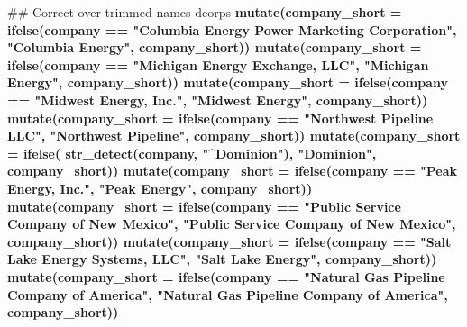 \documentclass[]{article}
\newenvironment{Shaded}{\begin{snugshade}}{\end{snugshade}}
\newcommand{\KeywordTok}[1]{\textcolor[rgb]{0.13,0.29,0.53}{\textbf{#1}}}
\newcommand{\DataTypeTok}[1]{\textcolor[rgb]{0.13,0.29,0.53}{#1}}
\newcommand{\StringTok}[1]{\textcolor[rgb]{0.31,0.60,0.02}{#1}}
\newcommand{\OperatorTok}[1]{\textcolor[rgb]{0.81,0.36,0.00}{\textbf{#1}}}
\newcommand{\NormalTok}[1]{#1}
\begin{document}
\begin{Shaded}
\begin{Highlighting}[]
\NormalTok{## Correct over-trimmed names}
\NormalTok{dcorps }\OperatorTok{%
\StringTok{  }\KeywordTok{mutate}\NormalTok{(}\DataTypeTok{company_short =} \KeywordTok{ifelse}\NormalTok{(company }\OperatorTok{==}\StringTok{ "Columbia Energy Power Marketing Corporation"}\NormalTok{, }\StringTok{"Columbia Energy"}\NormalTok{, company_short))}\OperatorTok{%
\StringTok{  }\KeywordTok{mutate}\NormalTok{(}\DataTypeTok{company_short =} \KeywordTok{ifelse}\NormalTok{(company }\OperatorTok{==}\StringTok{ "Michigan Energy Exchange, LLC"}\NormalTok{, }\StringTok{"Michigan Energy"}\NormalTok{, company_short))}\OperatorTok{%
\StringTok{  }\KeywordTok{mutate}\NormalTok{(}\DataTypeTok{company_short =} \KeywordTok{ifelse}\NormalTok{(company }\OperatorTok{==}\StringTok{ "Midwest Energy, Inc."}\NormalTok{, }\StringTok{"Midwest Energy"}\NormalTok{, company_short))}\OperatorTok{%
\StringTok{  }\KeywordTok{mutate}\NormalTok{(}\DataTypeTok{company_short =} \KeywordTok{ifelse}\NormalTok{(company }\OperatorTok{==}\StringTok{ "Northwest Pipeline LLC"}\NormalTok{, }\StringTok{"Northwest Pipeline"}\NormalTok{, company_short))}\OperatorTok{%
\StringTok{  }\KeywordTok{mutate}\NormalTok{(}\DataTypeTok{company_short =} \KeywordTok{ifelse}\NormalTok{( }\KeywordTok{str_detect}\NormalTok{(company, }\StringTok{"^Dominion"}\NormalTok{), }
                                 \StringTok{"Dominion"}\NormalTok{, company_short))}\OperatorTok{%
\StringTok{  }\KeywordTok{mutate}\NormalTok{(}\DataTypeTok{company_short =} \KeywordTok{ifelse}\NormalTok{(company }\OperatorTok{==}\StringTok{ "Peak Energy, Inc."}\NormalTok{, }\StringTok{"Peak Energy"}\NormalTok{, company_short))}\OperatorTok{%
\StringTok{  }\KeywordTok{mutate}\NormalTok{(}\DataTypeTok{company_short =} \KeywordTok{ifelse}\NormalTok{(company }\OperatorTok{==}\StringTok{ "Public Service Company of New Mexico"}\NormalTok{, }\StringTok{"Public Service Company of New Mexico"}\NormalTok{, company_short))}\OperatorTok{%
\StringTok{  }\KeywordTok{mutate}\NormalTok{(}\DataTypeTok{company_short =} \KeywordTok{ifelse}\NormalTok{(company }\OperatorTok{==}\StringTok{ "Salt Lake Energy Systems, LLC"}\NormalTok{, }\StringTok{"Salt Lake Energy"}\NormalTok{, company_short))}\OperatorTok{%
\StringTok{  }\KeywordTok{mutate}\NormalTok{(}\DataTypeTok{company_short =} \KeywordTok{ifelse}\NormalTok{(company }\OperatorTok{==}\StringTok{ "Natural Gas Pipeline Company of America"}\NormalTok{, }\StringTok{"Natural Gas Pipeline Company of America"}\NormalTok{, company_short))}\OperatorTok{%
}}}}}}}}}}
\end{Highlighting}
\end{Shaded}
\end{document}
